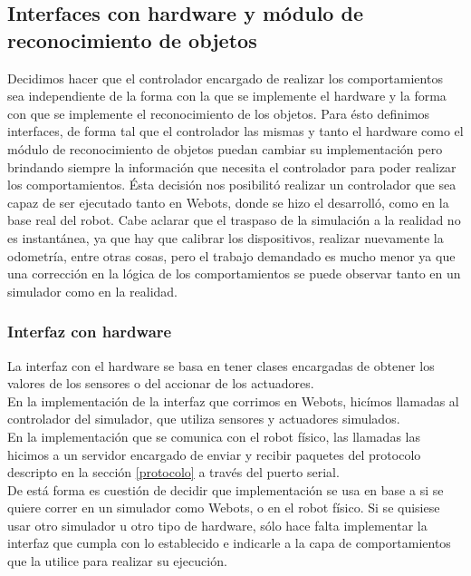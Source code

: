 \subsection{Interfaces con hardware y m\'odulo de reconocimiento de objetos}
\label{interfaces}
Decidimos hacer que el controlador encargado de realizar los comportamientos sea independiente
de la forma con la que se implemente el hardware y la forma con que se implemente el reconocimiento
de los objetos. Para \'esto definimos interfaces, de forma tal que el controlador las mismas
y tanto el hardware como el m\'odulo de reconocimiento de objetos puedan cambiar su implementaci\'on
pero brindando siempre la informaci\'on que necesita el controlador para poder realizar
los comportamientos. \'Esta decisi\'on nos posibilit\'o realizar un controlador que sea capaz de ser
ejecutado tanto en Webots, donde se hizo el desarroll\'o, como en la base real del robot. Cabe aclarar
que el traspaso de la simulaci\'on a la realidad no es instant\'anea, ya que hay que calibrar los dispositivos,
realizar nuevamente la odometr\'ia, entre otras cosas, pero el trabajo demandado es mucho menor ya
que una correcci\'on en la l\'ogica de los comportamientos se puede observar tanto en un simulador como
en la realidad.

\subsubsection{Interfaz con hardware}
La interfaz con el hardware se basa en tener clases encargadas de obtener los valores de los sensores
o del accionar de los actuadores.
\\En la implementaci\'on de la interfaz que corrimos en Webots, hic\'imos
llamadas al controlador del simulador, que utiliza sensores y actuadores simulados.
\\En la implementaci\'on que se comunica con el robot f\'isico,
las llamadas las hicimos a un servidor encargado de enviar y recibir paquetes del protocolo descripto
en la secci\'on \ref{protocolo} a trav\'es del puerto serial.
\\De est\'a forma es cuesti\'on de decidir que implementaci\'on se usa en base a si se quiere
correr en un simulador como Webots, o en el robot f\'isico. Si se quisiese usar otro simulador
u otro tipo de hardware, s\'olo hace falta implementar la interfaz que cumpla con lo establecido e
indicarle a la capa de comportamientos que la utilice para realizar su ejecuci\'on.

